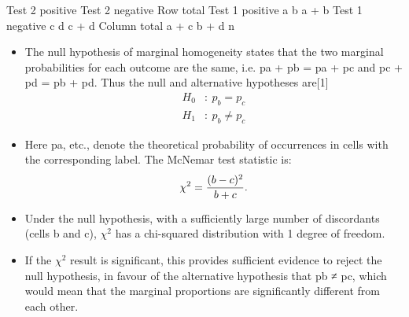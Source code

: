 \documentclass[a4paper,12pt]{article}
\begin{document}
Test 2 positive
Test 2 negative
Row total 
Test 1 positive
a
b
a + b 
Test 1 negative
c
d
c + d 
Column total
a + c
b + d
n 
\begin{itemize}
    \item The null hypothesis of marginal homogeneity states that the two marginal probabilities for each outcome are the same, i.e. pa + pb = pa + pc and pc + pd = pb + pd. 
Thus the null and alternative hypotheses are[1] 
\[{\displaystyle {\begin{aligned}H_{0}&:~p_{b}=p_{c}\\H_{1}&:~p_{b}\neq p_{c}\end{aligned}}} \]

\item Here pa, etc., denote the theoretical probability of occurrences in cells with the corresponding label. 
The McNemar test statistic is: 
 \[{\displaystyle \chi ^{2}={(b-c)^{2} \over b+c}.} \]

\item Under the null hypothesis, with a sufficiently large number of discordants (cells b and c), 
${\displaystyle \chi ^{2}} $
 has a chi-squared distribution with 1 degree of freedom. 
 \item If the 
${\displaystyle \chi ^{2}} $
 result is significant, this provides sufficient evidence to reject the null hypothesis, in favour of the alternative hypothesis that pb ≠ pc, which would mean that the marginal proportions are significantly different from each other. 
\end{itemize}
\end{document}
